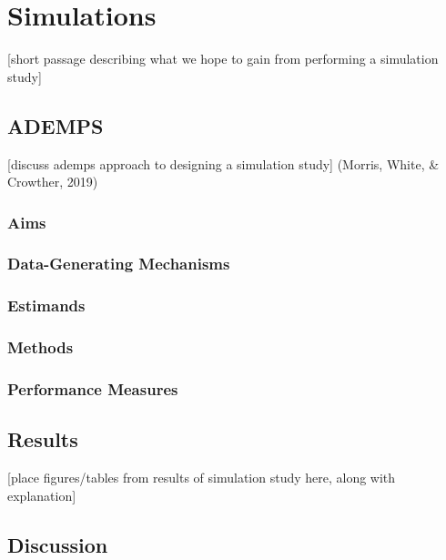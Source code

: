 \documentclass[12pt, twoside]{amherstthesis}
\begin{document}
\hypertarget{simulations}{%
\chapter{Simulations}\label{simulations}}

{[}short passage describing what we hope to gain from performing a simulation study{]}

\hypertarget{ademps}{%
\section{ADEMPS}\label{ademps}}

{[}discuss ademps approach to designing a simulation study{]} (Morris, White, \& Crowther, 2019)

\hypertarget{aims}{%
\subsection{Aims}\label{aims}}

\hypertarget{data_generating_mechanisms}{%
\subsection{Data-Generating Mechanisms}\label{data_generating_mechanisms}}

\hypertarget{estimands}{%
\subsection{Estimands}\label{estimands}}

\hypertarget{methods}{%
\subsection{Methods}\label{methods}}

\hypertarget{performance_measures}{%
\subsection{Performance Measures}\label{performance_measures}}

\hypertarget{results}{%
\section{Results}\label{results}}

{[}place figures/tables from results of simulation study here, along with explanation{]}

\hypertarget{discussion}{%
\section{Discussion}\label{discussion}}
\end{document}
